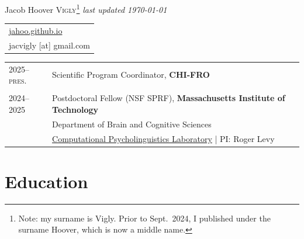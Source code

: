 \documentclass[11pt,a4paper]{article}
\begin{document}
\pagestyle{empty}
{\Huge{Jacob Hoover \scshape{Vigly}}\footnote{%
Note: my surname is Vigly. Prior to Sept.\ 2024, I published under the surname Hoover, which is now a middle name.%
}}
\hfill{}{\small\color{lightgray}\itshape last updated \monthyeardate\today}

\begin{tabular}{%
  l
}
  \href{https://jahoo.github.io}{jahoo.github.io}\\
  jacvigly [at] gmail.com\\
\end{tabular}

\vspace*{5pt}


\begin{longtable}{p{1.7cm}|p{15cm}}
  \textsc{2025--pres.}%
    &Scientific Program Coordinator,
    \textbf{CHI-FRO}\\
  \multicolumn{2}{c}{}\\
  \textsc{2024--2025}%
    &Postdoctoral Fellow (NSF SPRF),
    \textbf{Massachusetts Institute of Technology}\\
    &\quad{}Department of Brain and Cognitive Sciences\\
    &\quad{}\href{https://cpl.mit.edu}{Computational Psycholinguistics Laboratory} | PI: Roger Levy\\
  \end{longtable}

\section{Education}
\end{document}
